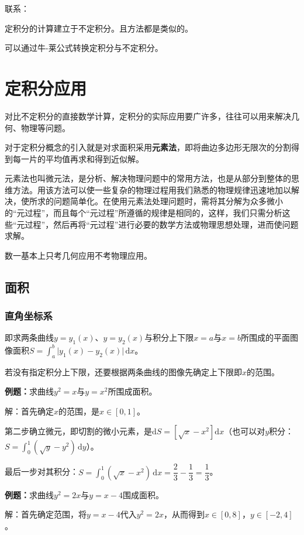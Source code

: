 \documentclass[UTF8, 12pt]{ctexart}
\begin{document}
联系：

定积分的计算建立于不定积分。且方法都是类似的。

可以通过牛-莱公式转换定积分与不定积分。

\section{定积分应用}

对比不定积分的直接数学计算，定积分的实际应用要广许多，往往可以用来解决几何、物理等问题。

对于定积分概念的引入就是对求面积采用\textbf{元素法}，即将曲边多边形无限次的分割得到每一片的平均值再求和得到近似解。

元素法也叫微元法，是分析、解决物理问题中的常用方法，也是从部分到整体的思维方法。用该方法可以使一些复杂的物理过程用我们熟悉的物理规律迅速地加以解决，使所求的问题简单化。在使用元素法处理问题时，需将其分解为众多微小的“元过程”，而且每个“元过程”所遵循的规律是相同的，这样，我们只需分析这些“元过程”，然后再将“元过程”进行必要的数学方法或物理思想处理，进而使问题求解。

数一基本上只考几何应用不考物理应用。

\subsection{面积}

\subsubsection{直角坐标系}

即求两条曲线$y=y_1(x)$、$y=y_2(x)$与积分上下限$x=a$与$x=b$所围成的平面图像面积$S=\int_a^b\vert y_1(x)-y_2(x)\vert\,\textrm{d}x$。

若没有指定积分上下限，还要根据两条曲线的图像先确定上下限即$x$的范围。

\textbf{例题：}求曲线$y^2=x$与$y=x^2$所围成面积。

解：首先确定$x$的范围，是$x\in[0,1]$。

第二步确立微元，即切割的微小元素，是$\textrm{d}S=[\sqrt{x}-x^2]\textrm{d}x$（也可以对$y$积分：$S=\int_0^1(\sqrt{y}-y^2)\,\textrm{d}y$）。

最后一步对其积分：$S=\int_0^1(\sqrt{x}-x^2)\,\textrm{d}x=\dfrac{2}{3}-\dfrac{1}{3}=\dfrac{1}{3}$。

\textbf{例题：}求曲线$y^2=2x$与$y=x-4$围成面积。

解：首先确定范围，将$y=x-4$代入$y^2=2x$，从而得到$x\in[0,8]$，$y\in[-2,4]$。
\end{document}
